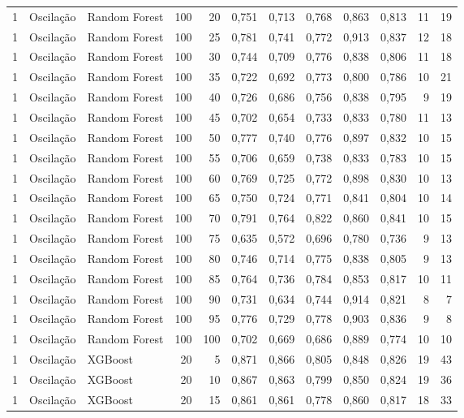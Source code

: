 \begin{longtable}{@{}rllrrrrrrrrr@{}}
1 & Oscilação & Random Forest & 100 & 20 & 0,751 & 0,713 & 0,768 & 0,863 & 0,813 & 11 & 19 \\
1 & Oscilação & Random Forest & 100 & 25 & 0,781 & 0,741 & 0,772 & 0,913 & 0,837 & 12 & 18 \\
1 & Oscilação & Random Forest & 100 & 30 & 0,744 & 0,709 & 0,776 & 0,838 & 0,806 & 11 & 18 \\
1 & Oscilação & Random Forest & 100 & 35 & 0,722 & 0,692 & 0,773 & 0,800 & 0,786 & 10 & 21 \\
1 & Oscilação & Random Forest & 100 & 40 & 0,726 & 0,686 & 0,756 & 0,838 & 0,795 & 9 & 19 \\
1 & Oscilação & Random Forest & 100 & 45 & 0,702 & 0,654 & 0,733 & 0,833 & 0,780 & 11 & 13 \\
1 & Oscilação & Random Forest & 100 & 50 & 0,777 & 0,740 & 0,776 & 0,897 & 0,832 & 10 & 15 \\
1 & Oscilação & Random Forest & 100 & 55 & 0,706 & 0,659 & 0,738 & 0,833 & 0,783 & 10 & 15 \\
1 & Oscilação & Random Forest & 100 & 60 & 0,769 & 0,725 & 0,772 & 0,898 & 0,830 & 10 & 13 \\
1 & Oscilação & Random Forest & 100 & 65 & 0,750 & 0,724 & 0,771 & 0,841 & 0,804 & 10 & 14 \\
1 & Oscilação & Random Forest & 100 & 70 & 0,791 & 0,764 & 0,822 & 0,860 & 0,841 & 10 & 15 \\
1 & Oscilação & Random Forest & 100 & 75 & 0,635 & 0,572 & 0,696 & 0,780 & 0,736 & 9 & 13 \\
1 & Oscilação & Random Forest & 100 & 80 & 0,746 & 0,714 & 0,775 & 0,838 & 0,805 & 9 & 13 \\
1 & Oscilação & Random Forest & 100 & 85 & 0,764 & 0,736 & 0,784 & 0,853 & 0,817 & 10 & 11 \\
1 & Oscilação & Random Forest & 100 & 90 & 0,731 & 0,634 & 0,744 & 0,914 & 0,821 & 8 & 7 \\
1 & Oscilação & Random Forest & 100 & 95 & 0,776 & 0,729 & 0,778 & 0,903 & 0,836 & 9 & 8 \\
1 & Oscilação & Random Forest & 100 & 100 & 0,702 & 0,669 & 0,686 & 0,889 & 0,774 & 10 & 10 \\
1 & Oscilação & XGBoost & 20 & 5 & 0,871 & 0,866 & 0,805 & 0,848 & 0,826 & 19 & 43 \\
1 & Oscilação & XGBoost & 20 & 10 & 0,867 & 0,863 & 0,799 & 0,850 & 0,824 & 19 & 36 \\
1 & Oscilação & XGBoost & 20 & 15 & 0,861 & 0,861 & 0,778 & 0,860 & 0,817 & 18 & 33 \\

\end{longtable}

